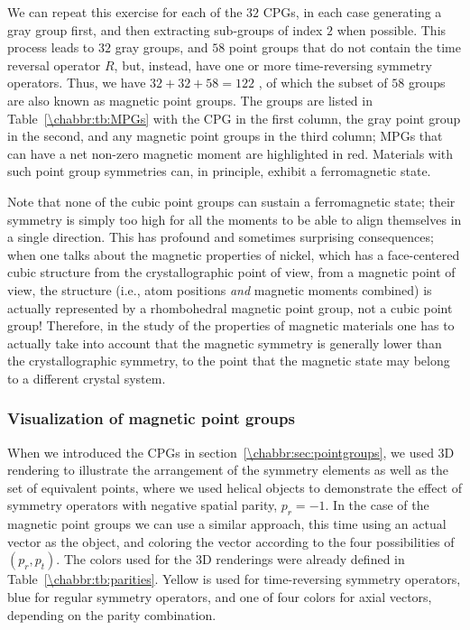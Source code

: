 We can repeat this exercise for each of the $32$ CPGs, in each case generating a gray group first, and then extracting sub-groups of index $2$ when possible.  This process leads to $32$ gray groups, and $58$ point groups that do not contain the time reversal operator $R$, but, instead, have one or more time-reversing symmetry operators. Thus, we have $32+32+58=122$ , of which the subset of $58$ groups are also known as magnetic point groups.  The groups are listed in Table~\ref{\chabbr:tb:MPGs} with the CPG in the first column, the gray point group in the second, and any magnetic point groups in the third column; MPGs that can have a net non-zero magnetic moment are highlighted in red.  Materials with such point group symmetries can, in principle, exhibit a ferromagnetic state.

Note that none of the cubic point groups can sustain a ferromagnetic state; their symmetry is simply too high for all the moments to be able to align themselves in a single direction. This has profound and sometimes surprising consequences; when one talks about the magnetic properties of nickel, which has a face-centered cubic structure from the crystallographic point of view, from a magnetic point of view, the structure (i.e., atom positions \textit{and} magnetic moments combined) is actually represented by a rhombohedral magnetic point group, not a cubic point group!  Therefore, in the study of the properties of magnetic materials one has to actually take into account that the magnetic symmetry is generally lower than the crystallographic symmetry, to the point that the magnetic state may belong to a different crystal system.

\subsubsection{Visualization of magnetic point groups}
When we introduced the CPGs in section~\ref{\chabbr:sec:pointgroups}, we used 3D rendering to illustrate the arrangement of the symmetry elements as well as the set of equivalent points, where we used  helical objects to demonstrate the effect of symmetry operators with negative spatial parity, $p_r=-1$.  In the case of the magnetic point groups we can use a similar approach, this time using an actual vector as the object, and coloring the vector according to the four possibilities of $(p_r,p_t)$.  The colors used for the 3D renderings were already defined in Table~\ref{\chabbr:tb:parities}. Yellow is used for time-reversing symmetry operators, blue for regular symmetry operators, and one of four colors for axial vectors, depending on the parity combination.  

